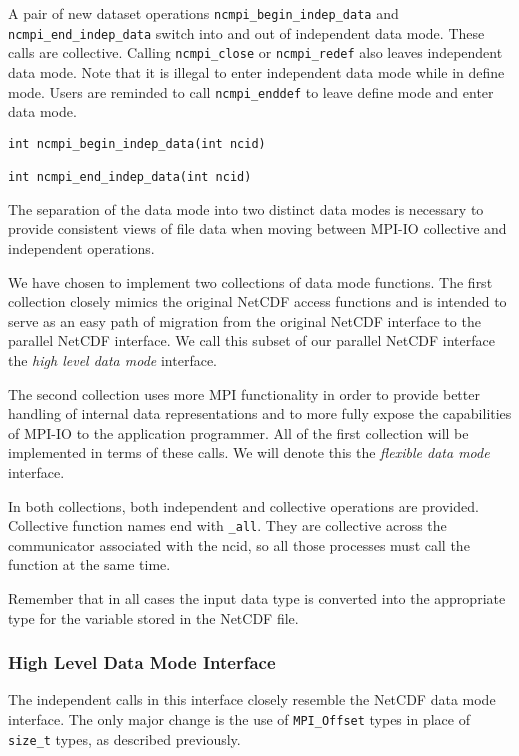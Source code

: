 \documentclass[10pt]{article}
\begin{document}
A pair of new dataset operations \texttt{ncmpi\_begin\_indep\_data} and
\texttt{ncmpi\_end\_indep\_data} switch into and out of independent data mode.
These calls are collective.  Calling \texttt{ncmpi\_close} or
\texttt{ncmpi\_redef} also leaves independent data mode.
Note that it is illegal to enter independent data mode while in define mode.
Users are reminded to call {\tt ncmpi\_enddef} to leave define mode and enter data mode.

\begin{verbatim}
int ncmpi_begin_indep_data(int ncid)

int ncmpi_end_indep_data(int ncid)
\end{verbatim}

The separation of the data mode into two distinct data modes is necessary to
provide consistent views of file data when moving between MPI-IO collective
and independent operations.

We have chosen to implement two collections of data mode functions.  The first
collection closely mimics the original NetCDF access functions and is intended
to serve as an easy path of migration from the original NetCDF interface to
the parallel NetCDF interface.  We call this subset of our parallel NetCDF
interface the \emph{high level data mode} interface.

The second collection uses more MPI functionality in order to provide better
handling of internal data representations and to more fully expose the
capabilities of MPI-IO to the application programmer.  All of the first
collection will be implemented in terms of these calls.  We will denote this
the \emph{flexible data mode} interface.

In both collections, both independent and collective operations are provided.
Collective function names end with \texttt{\_all}.  They are collective across
the communicator associated with the ncid, so all those processes must call
the function at the same time.

Remember that in all cases the input data type is converted into the
appropriate type for the variable stored in the NetCDF file.

\subsubsection{High Level Data Mode Interface}

The independent calls in this interface closely resemble the NetCDF data mode
interface.  The only major change is the use of \texttt{MPI\_Offset} types in
place of \texttt{size\_t} types, as described previously.
\end{document}
